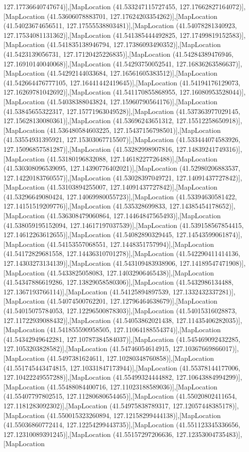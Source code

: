 127.17736640747674)],[MapLocation (41.533247115727455, 127.17662827164072)],[MapLocation (41.53606078883701, 127.17624203354262)],[MapLocation (41.54023674656511, 127.17555538803481)],[MapLocation (41.54078281340923, 127.17534081131362)],[MapLocation (41.541385444492825, 127.17499819152583)],[MapLocation (41.541835138946794, 127.17386093490352)],[MapLocation (41.5423139056731, 127.17120425226835)],[MapLocation (41.54284389476946, 127.16910140040068)],[MapLocation (41.54293750052541, 127.16836263586637)],[MapLocation (41.54292144033684, 127.16561605383512)],[MapLocation (41.542664476777105, 127.16441442419645)],[MapLocation (41.54194176129073, 127.16269781042692)],[MapLocation (41.541170855868955, 127.16080953528044)],[MapLocation (41.54038388043824, 127.15960790564176)],[MapLocation (41.53845655322317, 127.15771963049528)],[MapLocation (41.537363977029145, 127.15628130080361)],[MapLocation (41.53696243651312, 127.15512258650918)],[MapLocation (41.536480584603225, 127.15437156798501)],[MapLocation (41.53554931395921, 127.15303067715507)],[MapLocation (41.533444074583926, 127.15096857581287)],[MapLocation (41.53282998907816, 127.14839241749316)],[MapLocation (41.53180196832088, 127.14618227726488)],[MapLocation (41.530308096539095, 127.14390776402021)],[MapLocation (41.52980206883537, 127.14220183760557)],[MapLocation (41.53028397049721, 127.14091437727842)],[MapLocation (41.53103894255007, 127.14091437727842)],[MapLocation (41.53296649080424, 127.14069980055723)],[MapLocation (41.53394630581422, 127.14151519209776)],[MapLocation (41.535328699833, 127.14385454178652)],[MapLocation (41.536308479060864, 127.14464847565493)],[MapLocation (41.538059195152094, 127.14617197037539)],[MapLocation (41.539158567854415, 127.14612263612655)],[MapLocation (41.54082890329445, 127.14543599061874)],[MapLocation (41.54153557068551, 127.1448351757994)],[MapLocation (41.54172829681558, 127.14436310701278)],[MapLocation (41.542290411414136, 127.14303273134139)],[MapLocation (41.543109483938906, 127.14189547471908)],[MapLocation (41.5433825058083, 127.14032906465438)],[MapLocation (41.54347886619286, 127.13829058580306)],[MapLocation (41.5432986134488, 127.1367193766114)],[MapLocation (41.54125894897539, 127.1332432337281)],[MapLocation (41.54074500762201, 127.12796464638679)],[MapLocation (41.54015075784053, 127.12296500878303)],[MapLocation (41.54015316028873, 127.11722939088432)],[MapLocation (41.54053862021438, 127.11435406282035)],[MapLocation (41.541855590958505, 127.11064188554374)],[MapLocation (41.54342949642281, 127.10787384584037)],[MapLocation (41.545469092432285, 127.1053203828582)],[MapLocation (41.54746054614915, 127.10367669866017)],[MapLocation (41.5497381624611, 127.10280348760858)],[MapLocation (41.551745443474815, 127.10331847173944)],[MapLocation (41.55378144177006, 127.10422249557288)],[MapLocation (41.55499324444882, 127.10643884994299)],[MapLocation (41.55488084400716, 127.11023188589036)],[MapLocation (41.55407797802515, 127.11280680654465)],[MapLocation (41.55020802411654, 127.1181283092302)],[MapLocation (41.54975838789317, 127.12057448385178)],[MapLocation (41.550015323260894, 127.12158299444138)],[MapLocation (41.55036860772414, 127.12254299443735)],[MapLocation (41.551123345336656, 127.12310089391245)],[MapLocation (41.55157297206636, 127.12353004735483)],[MapLocation 